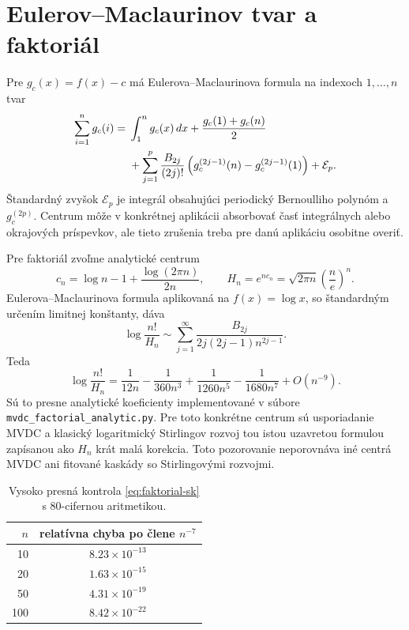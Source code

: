 \documentclass[11pt,a4paper]{article}
\begin{document}
\section{Eulerov--Maclaurinov tvar a faktoriál}

Pre \(g_c(x)=f(x)-c\) má Eulerova--Maclaurinova formula na indexoch
\(1,\ldots,n\) tvar
\begin{align}
  \sum_{i=1}^{n}g_c(i)
  ={}&
  \int_1^n g_c(x)\,dx
  +\frac{g_c(1)+g_c(n)}2 \notag\\
  &+\sum_{j=1}^{p}
  \frac{B_{2j}}{(2j)!}
  \left(g_c^{(2j-1)}(n)-g_c^{(2j-1)}(1)\right)
  +\mathcal E_p . \label{eq:EM-sk}
\end{align}
Štandardný zvyšok \(\mathcal E_p\) je integrál obsahujúci periodický
Bernoulliho polynóm a \(g_c^{(2p)}\). Centrum môže v konkrétnej aplikácii
absorbovať časť integrálnych alebo okrajových príspevkov, ale tieto
zrušenia treba pre danú aplikáciu osobitne overiť.

Pre faktoriál zvoľme analytické centrum
\[
  c_n=\log n-1+\frac{\log(2\pi n)}{2n},\qquad
  H_n=e^{nc_n}=\sqrt{2\pi n}\left(\frac ne\right)^n .
\]
Eulerova--Maclaurinova formula aplikovaná na \(f(x)=\log x\), so
štandardným určením limitnej konštanty, dáva
\begin{equation}\label{eq:faktorial-sk}
  \log\frac{n!}{H_n}
  \sim
  \sum_{j=1}^{\infty}
  \frac{B_{2j}}{2j(2j-1)n^{2j-1}}.
\end{equation}
Teda
\[
  \log\frac{n!}{H_n}
  =
  \frac1{12n}-\frac1{360n^3}
  +\frac1{1260n^5}-\frac1{1680n^7}
  +O(n^{-9}).
\]
Sú to presne analytické koeficienty implementované v súbore
\texttt{mvdc\_factorial\_analytic.py}. Pre toto konkrétne centrum sú
usporiadanie MVDC a klasický logaritmický Stirlingov rozvoj tou istou
uzavretou formulou zapísanou ako \(H_n\) krát malá korekcia. Toto
pozorovanie neporovnáva iné centrá MVDC ani fitované kaskády so
Stirlingovými rozvojmi.

\begin{table}[ht]
\centering
\begin{tabular}{rc}
\toprule
\(n\) & relatívna chyba po člene \(n^{-7}\) \\
\midrule
10  & \(8.23\times10^{-13}\) \\
20  & \(1.63\times10^{-15}\) \\
50  & \(4.31\times10^{-19}\) \\
100 & \(8.42\times10^{-22}\) \\
\bottomrule
\end{tabular}
\caption{Vysoko presná kontrola \eqref{eq:faktorial-sk} s 80-cifernou aritmetikou.}
\end{table}
\end{document}
